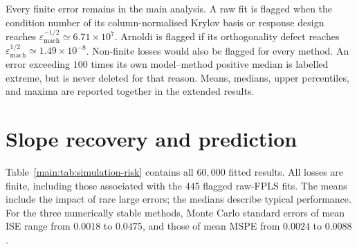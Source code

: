 Every finite error remains in the main analysis. A raw fit is flagged
when the condition number of its column-normalised Krylov basis or
response design reaches $\varepsilon_{\mathrm{mach}}^{-1/2}
\simeq6.71\times10^7$. Arnoldi is flagged if its orthogonality defect
reaches $\varepsilon_{\mathrm{mach}}^{1/2}\simeq1.49\times10^{-8}$.
Non-finite losses would also be flagged for every method. An error
exceeding $100$ times its own model--method positive median is labelled
extreme, but is never deleted for that reason. Means, medians, upper
percentiles, and maxima are reported together in the extended results.

\section{Slope recovery and prediction}
\label{main:sec:simulation-risk}

Table~\ref{main:tab:simulation-risk} contains all $60{,}000$ fitted results.
All losses are finite, including those associated with the $445$ flagged
raw-FPLS fits. The means include the impact of rare large errors; the
medians describe typical performance. For the three numerically stable
methods, Monte Carlo standard errors of mean ISE range from $0.0018$ to
$0.0475$, and those of mean MSPE from $0.0024$ to $0.0088$.

